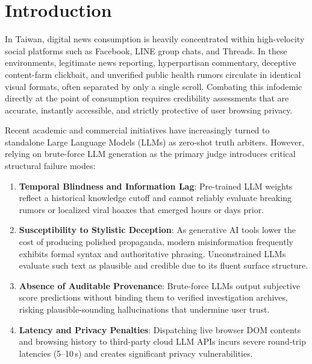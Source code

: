 \documentclass[twoside]{llncs}
\begin{document}
\section{Introduction}

In Taiwan, digital news consumption is heavily concentrated within high-velocity social platforms such as Facebook, LINE group chats, and Threads. In these environments, legitimate news reporting, hyperpartisan commentary, deceptive content-farm clickbait, and unverified public health rumors circulate in identical visual formats, often separated by only a single scroll. Combating this infodemic directly at the point of consumption requires credibility assessments that are accurate, instantly accessible, and strictly protective of user browsing privacy.

Recent academic and commercial initiatives have increasingly turned to standalone Large Language Models (LLMs) as zero-shot truth arbiters. However, relying on brute-force LLM generation as the primary judge introduces critical structural failure modes:
\begin{enumerate}
  \item \textbf{Temporal Blindness and Information Lag}: Pre-trained LLM weights reflect a historical knowledge cutoff and cannot reliably evaluate breaking rumors or localized viral hoaxes that emerged hours or days prior.
  \item \textbf{Susceptibility to Stylistic Deception}: As generative AI tools lower the cost of producing polished propaganda, modern misinformation frequently exhibits formal syntax and authoritative phrasing. Unconstrained LLMs evaluate such text as plausible and credible due to its fluent surface structure.
  \item \textbf{Absence of Auditable Provenance}: Brute-force LLMs output subjective score predictions without binding them to verified investigation archives, risking plausible-sounding hallucinations that undermine user trust.
  \item \textbf{Latency and Privacy Penalties}: Dispatching live browser DOM contents and browsing history to third-party cloud LLM APIs incurs severe round-trip latencies (5--10\,s) and creates significant privacy vulnerabilities.
\end{enumerate}
\end{document}
